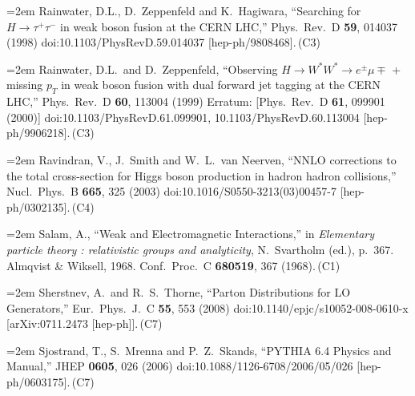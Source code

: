 \documentclass[letter,12pt]{article}
\def\xbibitem#1#2#3{\noindent\hangindent=2em #2\,(#3)}
\begin{document}
\xbibitem{Rainwater:1998kj}{Rainwater, D.L., D.~Zeppenfeld and K.~Hagiwara,
  ``Searching for $H\to\tau^+\tau^-$ in weak boson fusion at the CERN LHC,''
  Phys.\ Rev.\ D {\bf 59}, 014037 (1998)
  doi:10.1103/PhysRevD.59.014037
  [hep-ph/9808468].}{C3}
  
\xbibitem{Rainwater:1999sd}{Rainwater, D.L.\ and D.~Zeppenfeld,
  ``Observing $H\to W^*W^* \to e^\pm \mu\mp$ + missing $p_T$  in weak boson fusion with dual forward jet tagging at the CERN LHC,''
  Phys.\ Rev.\ D {\bf 60}, 113004 (1999)
  Erratum: [Phys.\ Rev.\ D {\bf 61}, 099901 (2000)]
  doi:10.1103/PhysRevD.61.099901, 10.1103/PhysRevD.60.113004
  [hep-ph/9906218].}{C3}
  
\xbibitem{Ravindran:2003um}{Ravindran, V., J.~Smith and W.~L.~van Neerven,
  ``NNLO corrections to the total cross-section for Higgs boson production in hadron hadron collisions,''
  Nucl.\ Phys.\ B {\bf 665}, 325 (2003)
  doi:10.1016/S0550-3213(03)00457-7
  [hep-ph/0302135].}{C4}
  
\xbibitem{Salam:1968rm}{Salam, A.,
  ``Weak and Electromagnetic Interactions,''
  in {\it Elementary particle theory : relativistic groups and analyticity}, N.\ Svartholm (ed.), p.\ 367. 
  Almqvist \& Wiksell, 1968.
  Conf.\ Proc.\ C {\bf 680519}, 367 (1968).}{C1}


\xbibitem{Sherstnev:2007nd}{Sherstnev, A.\ and R.~S.~Thorne,
  ``Parton Distributions for LO Generators,''
  Eur.\ Phys.\ J.\ C {\bf 55}, 553 (2008)
  doi:10.1140/epjc/s10052-008-0610-x
  [arXiv:0711.2473 [hep-ph]].}{C7}
  
\xbibitem{Sjostrand:2006za}{Sjostrand, T., S.~Mrenna and P.~Z.~Skands,
  ``PYTHIA 6.4 Physics and Manual,''
  JHEP {\bf 0605}, 026 (2006)
  doi:10.1088/1126-6708/2006/05/026
  [hep-ph/0603175].}{C7}
  
\end{document}
